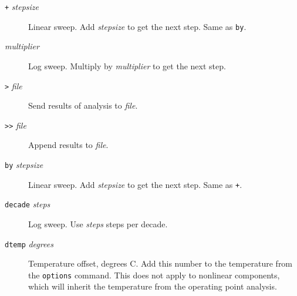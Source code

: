 \begin{description}

\item[{\tt +} {\it stepsize}] Linear sweep.  Add {\it
stepsize} to get the next step.  Same as {\tt by}.

\item[{\tt *} {\it multiplier}] Log sweep.  Multiply by
{\it multiplier} to get the next step.


\item[{\tt >} {\it file}] Send results of analysis to {\it file}.

\item[{\tt >>} {\it file}] Append results to {\it file}.



\item[{\tt by} {\it stepsize}] Linear sweep.  Add {\it
stepsize} to get the next step.  Same as {\tt +}.




\item[{\tt decade} {\it steps}] Log sweep.  Use {\it
steps} steps per decade.

\item[{\tt dtemp} {\it degrees}] Temperature offset,
degrees C.  Add this number to the temperature from the {\tt options}
command.  This does not apply to nonlinear components, which will
inherit the temperature from the operating point analysis.




\end{description}
